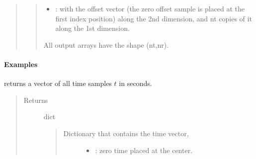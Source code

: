 \documentclass[letterpaper,10pt,english]{sphinxmanual}
\begin{document}
\begin{fulllineitems}
\begin{fulllineitems}
\begin{quote}
\begin{description}
\begin{quote}
\begin{description}
\begin{itemize}
\item {} 
: with the offset vector  (the zero offset sample is placed at the first index position) along the 2nd dimension, and nt copies of it along the 1st dimension.

\end{itemize}

\end{description}

All output arrays have the shape (nt,nr).
\end{quote}

\end{description}\end{quote}
\paragraph{Examples}

%
\begin{sphinxVerbatim}[commandchars=\\\{\}]
     
\PYG{p}{[}\PYG{p}{]}\PYG{p}{[}\PYG{p}{]}
\end{sphinxVerbatim}

\end{fulllineitems}


\begin{fulllineitems}
\label{\detokenize{Wavefield_NRM_p_w:Wavefield_NRM_p_w.Wavefield_NRM_p_w.Tvec}}
returns a vector of all time samples \(t\) in seconds.
\begin{quote}\begin{description}
\item[{Returns}] \leavevmode
dict
\begin{quote}
\begin{description}
\item[{Dictionary that contains the time vector, }] \leavevmode\begin{itemize}
\item {} 
: zero time placed at the center.


\end{itemize}
\end{description}
\end{quote}
\end{description}
\end{quote}
\end{fulllineitems}
\end{fulllineitems}
\end{document}
